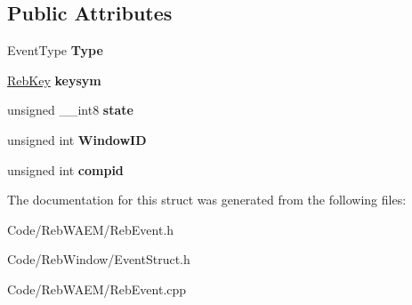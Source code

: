 \subsection*{Public Attributes}
\begin{DoxyCompactItemize}
\item 
Event\+Type {\bfseries Type}\hypertarget{class_reb_key_event_add1f586c93da02e12cd73728a8626fbc}{}\label{class_reb_key_event_add1f586c93da02e12cd73728a8626fbc}

\item 
\hyperlink{struct_reb_key}{Reb\+Key} {\bfseries keysym}\hypertarget{class_reb_key_event_aeeb1b16c6c861dece4500766b18020f4}{}\label{class_reb_key_event_aeeb1b16c6c861dece4500766b18020f4}

\item 
unsigned \+\_\+\+\_\+int8 {\bfseries state}\hypertarget{class_reb_key_event_a28ab889f5d219b4bfa07cc776644151f}{}\label{class_reb_key_event_a28ab889f5d219b4bfa07cc776644151f}

\item 
unsigned int {\bfseries Window\+ID}\hypertarget{class_reb_key_event_a17ca5cbea5b27bfe2cbcd35083b0e133}{}\label{class_reb_key_event_a17ca5cbea5b27bfe2cbcd35083b0e133}

\item 
unsigned int {\bfseries compid}\hypertarget{class_reb_key_event_a7cb44afc56d80d2e592f1c8a5314e5ed}{}\label{class_reb_key_event_a7cb44afc56d80d2e592f1c8a5314e5ed}

\end{DoxyCompactItemize}


The documentation for this struct was generated from the following files\+:\begin{DoxyCompactItemize}
\item 
Code/\+Reb\+W\+A\+E\+M/Reb\+Event.\+h\item 
Code/\+Reb\+Window/Event\+Struct.\+h\item 
Code/\+Reb\+W\+A\+E\+M/Reb\+Event.\+cpp\end{DoxyCompactItemize}
